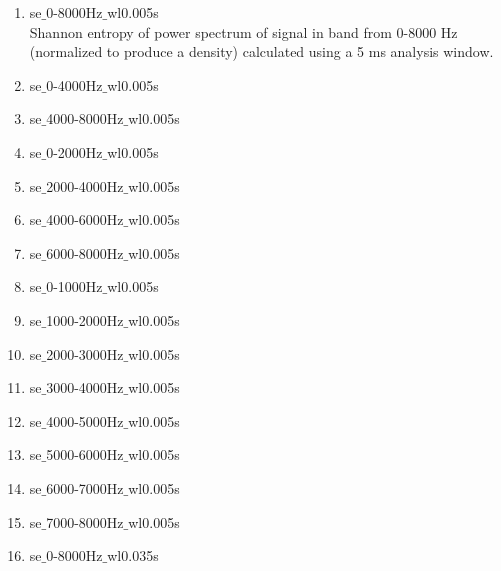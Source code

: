 \documentclass[12pt]{article}
\begin{document}
\begin{enumerate}
    \item se$\_$0-8000Hz$\_$wl0.005s \\
      Shannon entropy of power spectrum of signal in band from 0-8000 Hz (normalized to produce a density) calculated using a 5 ms analysis window. 

    \item se$\_$0-4000Hz$\_$wl0.005s \\

    \item se$\_$4000-8000Hz$\_$wl0.005s \\

    \item se$\_$0-2000Hz$\_$wl0.005s \\

    \item se$\_$2000-4000Hz$\_$wl0.005s \\

    \item se$\_$4000-6000Hz$\_$wl0.005s \\

    \item se$\_$6000-8000Hz$\_$wl0.005s \\

    \item se$\_$0-1000Hz$\_$wl0.005s \\

    \item se$\_$1000-2000Hz$\_$wl0.005s \\

    \item se$\_$2000-3000Hz$\_$wl0.005s \\

    \item se$\_$3000-4000Hz$\_$wl0.005s \\

    \item se$\_$4000-5000Hz$\_$wl0.005s \\

    \item se$\_$5000-6000Hz$\_$wl0.005s \\

    \item se$\_$6000-7000Hz$\_$wl0.005s \\

    \item se$\_$7000-8000Hz$\_$wl0.005s \\

    \item se$\_$0-8000Hz$\_$wl0.035s \\


\end{enumerate}
\end{document}
